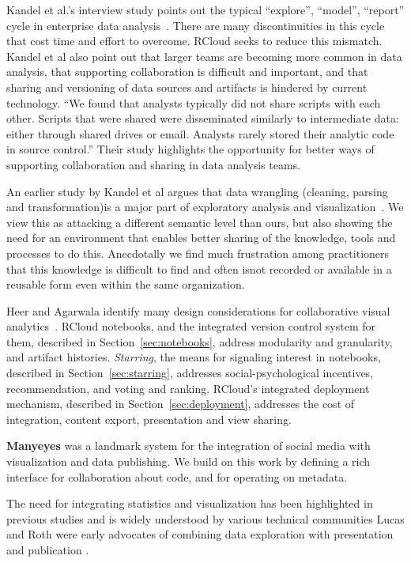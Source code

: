 Kandel et al.'s interview study points out the typical ``explore'',
``model'', ``report'' cycle in enterprise data
analysis~\cite{Kandel:2012:EDA}. There are many discontinuities in
this cycle that cost time and effort to overcome. RCloud seeks to
reduce this mismatch. Kandel et al also point out that larger teams
are becoming more common in data analysis, that supporting
collaboration is difficult and important, and that sharing
and versioning of data sources and artifacts is hindered by current
technology. ``We found that analysts typically did not
share scripts with each other. Scripts that were shared were
disseminated similarly to intermediate data: either through shared
drives or email. Analysts rarely stored their analytic code in source
control.'' Their study highlights the opportunity for better ways
of supporting collaboration and sharing in data analysis teams.

An earlier study by Kandel et al argues that data wrangling
(cleaning, parsing and transformation)is a major part of exploratory
analysis and visualization~\cite{Kandel:2011:RDI}. We view this
as attacking a different semantic level than ours, but also
showing the need for an environment that enables better sharing
of the knowledge, tools and processes to do this. Anecdotally
we find much frustration among practitioners that this knowledge
is difficult to find and often isnot recorded or available in a
reusable form even within the same organization.

Heer and Agarwala identify many design considerations for
collaborative visual analytics~\cite{Heer:2008:DCF}.
RCloud notebooks, and the integrated version control system for them,
described in Section~\ref{sec:notebooks}, address modularity and granularity,
and artifact histories.
\emph{Starring}, the means for signaling interest in notebooks, described in
Section~\ref{sec:starring}, addresses social-psychological incentives,
recommendation, and voting and ranking. RCloud's integrated deployment
mechanism, described in Section~\ref{sec:deployment}, addresses the cost of
integration, content export, presentation and view sharing.

{\bf Manyeyes} \cite{Viegas:2007:MAS} was a landmark system for the integration
of social media with visualization and data publishing. We build on this
work by defining a rich interface for collaboration about code, and for
operating on metadata.

The need for integrating statistics and visualization has been
highlighted in previous studies and is widely understood by
various technical communities \cite{Perer:2008:ISA}
Lucas and Roth were early advocates of combining
data exploration with presentation and publication \cite{Lucas:1996:EIV}.

